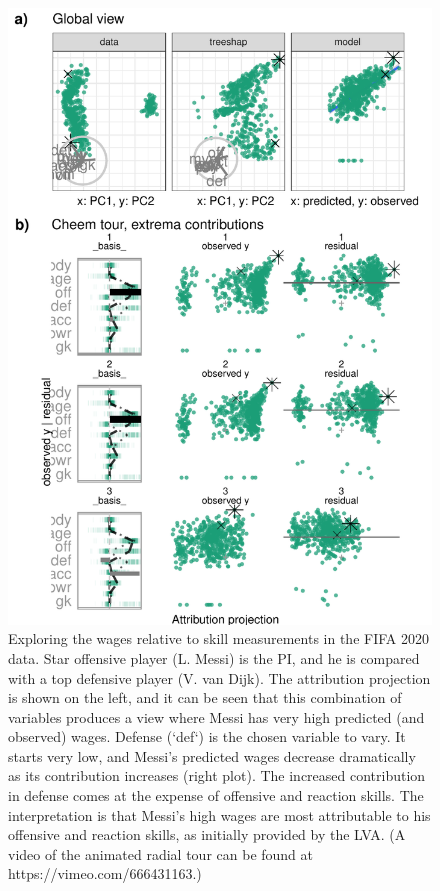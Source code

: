 \documentclass[
]{sn-jnl}
\begin{document}
\begin{CodeChunk}
\begin{figure}

{\centering \includegraphics[width=0.9\linewidth]{./figures/case_fifa} 

}

\caption[Exploring the wages relative to skill measurements in the FIFA 2020 data]{Exploring the wages relative to skill measurements in the FIFA 2020 data. Star offensive player (L. Messi) is the PI, and he is compared with a top defensive player (V. van Dijk). The attribution projection is shown on the left, and it can be seen that this combination of variables produces a view where Messi has very high predicted (and observed) wages. Defense (`def`) is the chosen variable to vary. It starts very low, and Messi's predicted wages decrease dramatically as its contribution increases (right plot). The increased contribution in defense comes at the expense of offensive and reaction skills. The interpretation is that Messi's high wages are most attributable to his offensive and reaction skills, as initially provided by the LVA. (A video of the animated radial tour can be found at https://vimeo.com/666431163.)}\label{fig:casefifa}
\end{figure}
\end{CodeChunk}
\end{document}
